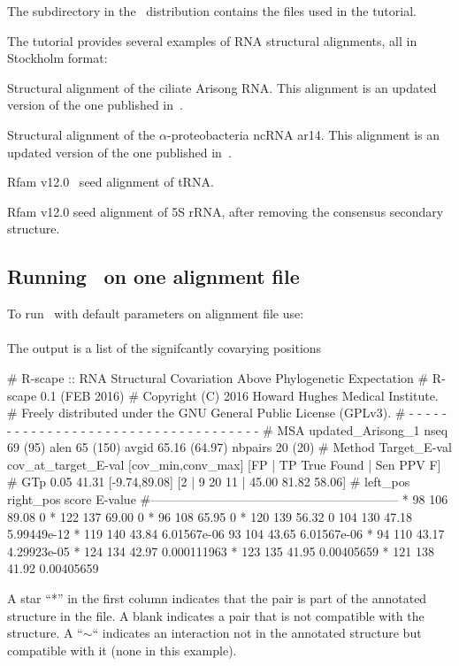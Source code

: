 The subdirectory  in the \rscape\ distribution contains the
files used in the tutorial. 

The tutorial provides several examples of RNA structural
alignments, all in Stockholm format:

\begin{sreitems}{}
\item[\emprog{updated\_Arisong.sto}] Structural alignment of the ciliate
  Arisong RNA. This alignment is an updated
  version of the one published in~\citep{JungEddy11}.
\item[\emprog{ar14.sto}] Structural alignment of the $\alpha$-proteobacteria ncRNA ar14. This alignment is an updated version of the one
  published in~\citep{delVal12}.
\item[\emprog{RF00005.sto}] Rfam v12.0~\citep{Nawrocki15} seed alignment of tRNA. 
\item[\emprog{RF00001-noss.sto}] Rfam v12.0 seed alignment of 5S rRNA, after removing the consensus secondary structure. 
\end{sreitems}


\subsection{Running \rscape\, on one alignment file}
To run \rscape\ with default parameters on alignment file
 use:\\

\\

\noindent
The output is a list of the signifcantly covarying positions

\begin{sreoutput}
# R-scape :: RNA Structural Covariation Above Phylogenetic Expectation
# R-scape 0.1 (FEB 2016)
# Copyright (C) 2016 Howard Hughes Medical Institute.
# Freely distributed under the GNU General Public License (GPLv3).
# - - - - - - - - - - - - - - - - - - - - - - - - - - - - - - - - - - - -
# MSA updated_Arisong_1 nseq 69 (95) alen 65 (150) avgid 65.16 (64.97) nbpairs 20 (20)
# Method Target_E-val cov_at_target_E-val [cov_min,conv_max] [FP | TP True Found | Sen PPV F] 
# GTp    0.05         41.31               [-9.74,89.08]      [2 | 9 20 11 | 45.00 81.82 58.06] 
#       left_pos       right_pos        score   E-value
#------------------------------------------------------------
*	      98	     106	89.08	0
*	     122	     137	69.00	0
*	      96	     108	65.95	0
*	     120	     139	56.32	0
 	     104	     130	47.18	5.99449e-12
*	     119	     140	43.84	6.01567e-06
 	      93	     104	43.65	6.01567e-06
*	      94	     110	43.17	4.29923e-05
*	     124	     134	42.97	0.000111963
*	     123	     135	41.95	0.00405659
*	     121	     138	41.92	0.00405659
\end{sreoutput}
A star ``*'' in the first column indicates that the pair is part of
the annotated structure in the  file. A
blank indicates a pair that is not compatible with the structure. A
``$\sim$`` indicates an interaction not in the annotated structure but
compatible with it (none in this example).

